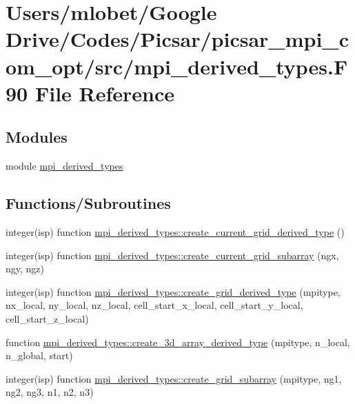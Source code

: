 \hypertarget{mpi__derived__types_8_f90}{}\section{Users/mlobet/\+Google Drive/\+Codes/\+Picsar/picsar\+\_\+mpi\+\_\+com\+\_\+opt/src/mpi\+\_\+derived\+\_\+types.F90 File Reference}
\label{mpi__derived__types_8_f90}
\subsection*{Modules}
\begin{DoxyCompactItemize}
\item 
module \hyperlink{namespacempi__derived__types}{mpi\+\_\+derived\+\_\+types}
\end{DoxyCompactItemize}
\subsection*{Functions/\+Subroutines}
\begin{DoxyCompactItemize}
\item 
integer(isp) function \hyperlink{namespacempi__derived__types_a4e591316977c3fa41e3cc0702f6adcf4}{mpi\+\_\+derived\+\_\+types\+::create\+\_\+current\+\_\+grid\+\_\+derived\+\_\+type} ()
\item 
integer(isp) function \hyperlink{namespacempi__derived__types_a7c5a0ff3b29c3edc9345259a18039046}{mpi\+\_\+derived\+\_\+types\+::create\+\_\+current\+\_\+grid\+\_\+subarray} (ngx, ngy, ngz)
\item 
integer(isp) function \hyperlink{namespacempi__derived__types_add427b42c00be9acdf56944f2d55e6e2}{mpi\+\_\+derived\+\_\+types\+::create\+\_\+grid\+\_\+derived\+\_\+type} (mpitype, nx\+\_\+local, ny\+\_\+local, nz\+\_\+local,                   cell\+\_\+start\+\_\+x\+\_\+local, cell\+\_\+start\+\_\+y\+\_\+local, cell\+\_\+start\+\_\+z\+\_\+local)
\item 
function \hyperlink{namespacempi__derived__types_a4c632b371019f467fc3544ee8a93ff10}{mpi\+\_\+derived\+\_\+types\+::create\+\_\+3d\+\_\+array\+\_\+derived\+\_\+type} (mpitype, n\+\_\+local, n\+\_\+global, start)
\item 
integer(isp) function \hyperlink{namespacempi__derived__types_aff1cd1875ad7e3e496b073d20fe156d7}{mpi\+\_\+derived\+\_\+types\+::create\+\_\+grid\+\_\+subarray} (mpitype, ng1, ng2, ng3, n1, n2, n3)
\end{DoxyCompactItemize}
